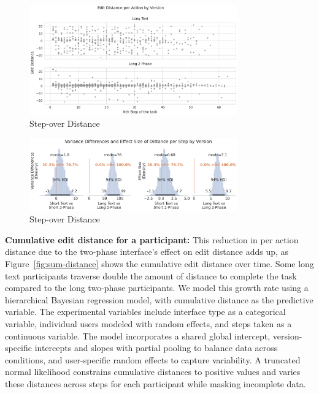 \begin{figure}[ht]
    \centering
    \includegraphics[width=0.8\textwidth]{content/image/distance/edit_distance_per_action_by_version.pdf}
    \caption{Step-over Distance}
    \label{fig:step-over-distance}
\end{figure}
\begin{figure}[ht]
    \centering
    \includegraphics[width=0.8\textwidth]{content/image/distance/distance_diff_per_step_effect_size_by_version.pdf}
    \caption{Step-over Distance}
    \label{fig:step-over-distance_bayesian}
\end{figure}

\textbf{Cumulative edit distance for a participant:} This reduction in per action distance due to the two-phase interface's effect on edit distance adds up, as Figure~\ref{fig:sum-distance} shows the cumulative edit distance over time. Some long text participants traverse double the amount of distance to complete the task compared to the long two-phase participants. We model this growth rate using a hierarchical Bayesian regression model, with cumulative distance as the predictive variable. The experimental variables include interface type as a categorical variable, individual users modeled with random effects, and steps taken as a continuous variable. The model incorporates a shared global intercept, version-specific intercepts and slopes with partial pooling to balance data across conditions, and user-specific random effects to capture variability. A truncated normal likelihood constrains cumulative distances to positive values and varies these distances across steps for each participant while masking incomplete data.

